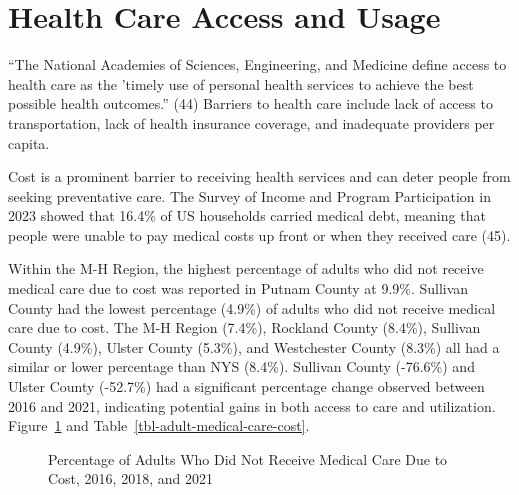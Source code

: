 \documentclass[
  english,
  letterpaper,
]{report}
\begin{document}
\section{Health Care Access and
Usage}\label{health-care-access-and-usage}

``The National Academies of Sciences, Engineering, and Medicine define
access to health care as the 'timely use of personal health services to
achieve the best possible health outcomes.'' (44) Barriers to health
care include lack of access to transportation, lack of health insurance
coverage, and inadequate providers per capita.

Cost is a prominent barrier to receiving health services and can deter
people from seeking preventative care. The Survey of Income and Program
Participation in 2023 showed that 16.4\% of US households carried
medical debt, meaning that people were unable to pay medical costs up
front or when they received care (45).

Within the M-H Region, the highest percentage of adults who did not
receive medical care due to cost was reported in Putnam County at 9.9\%.
Sullivan County had the lowest percentage (4.9\%) of adults who did not
receive medical care due to cost. The M-H Region (7.4\%), Rockland
County (8.4\%), Sullivan County (4.9\%), Ulster County (5.3\%), and
Westchester County (8.3\%) all had a similar or lower percentage than
NYS (8.4\%). Sullivan County (-76.6\%) and Ulster County (-52.7\%) had a
significant percentage change observed between 2016 and 2021, indicating
potential gains in both access to care and utilization.
Figure~\ref{fig-medical-care-cost} and
Table~\ref{tbl-adult-medical-care-cost}.

\begin{figure}


\caption{\label{fig-medical-care-cost}Percentage of Adults Who Did Not
Receive Medical Care Due to Cost, 2016, 2018, and 2021}

\end{figure}%
\end{document}
